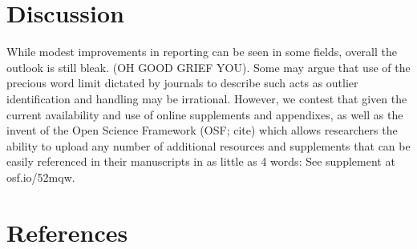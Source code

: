 \documentclass[english,man]{apa6}
\theoremstyle{definition}
\theoremstyle{definition}
\theoremstyle{definition}
\theoremstyle{remark}
\begin{document}
\section{Discussion}\label{discussion}

While modest improvements in reporting can be seen in some fields,
overall the outlook is still bleak. (OH GOOD GRIEF YOU). Some may argue
that use of the precious word limit dictated by journals to describe
such acts as outlier identification and handling may be irrational.
However, we contest that given the current availability and use of
online supplements and appendixes, as well as the invent of the Open
Science Framework (OSF; cite) which allows researchers the ability to
upload any number of additional resources and supplements that can be
easily referenced in their manuscripts in as little as 4 words: See
supplement at osf.io/52mqw.

\newpage

\section{References}\label{references}

\setlength{\parindent}{-0.5in} \setlength{\leftskip}{0.5in}
\end{document}
